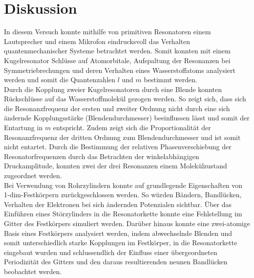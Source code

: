\section{Diskussion}
In diesem Versuch konnte mithilfe von primitiven Resonatoren einem Lautsprecher und
einem Mikrofon eindrucksvoll das Verhalten quantenmechanischer Systeme betrachtet werden.
Somit konnten mit einem Kugelresonator Schlüsse auf Atomorbitale, Aufspaltung der Resonanzen bei Symmetriebrechungen und deren Verhalten eines
Wasserstoffatoms analysiert werden und somit die Quantenzahlen $l$ und $m$ bestimmt werden.\\
Durch die Kopplung zweier Kugelresonatoren durch eine Blende konnten Rückschlüsse auf das Wasserstoffmolekül gezogen werden.
So zeigt sich, dass sich die Resonanzfrequenz der ersten und zweiter Ordnung nicht durch eine sich ändernde Kopplungsstärke (Blendendurchmesser)
beeinflussen lässt und somit der Entartung in $m$ entspricht. Zudem zeigt sich die Proportionalität
der Resonanzfrequenz der dritten Ordnung zum Blendendurchmesser und ist somit nicht entartet.
Durch die Bestimmung der relativen Phasenverschiebung der Resonatorfrequenzen durch das Betrachten der winkelabhängigen Druckamplitude, konnten zwei der drei Resonanzen
einem Molekülzustand zugeordnet werden.\\
Bei Verwendung von Rohrzylindern konnte auf grundlegende Eigenschaften von 1-dim-Festkörpern zurückgeschlossen werden. So würden Bändern, Bandlücken,
Verhalten der Elektronen bei sich ändernden Potenzialen sichtbar. Über das Einführen eines Störzylinders
in die Resonatorkette konnte eine Fehlstellung im Gitter des Festkörpers simuliert werden. Darüber hinaus konnte
eine zwei-atomige Basis eines Festkörpers analysiert werden, indem abwechselnde Blenden und somit unterschiedlich starke Kopplungen im Festkörper,
in die Resonatorkette eingebaut wurden und schlussendlich der Einfluss einer übergeordneten Periodizität
des Gitters und den daraus resultierenden neunen Bandlücken beobachtet werden.
\label{sec:Diskussion}